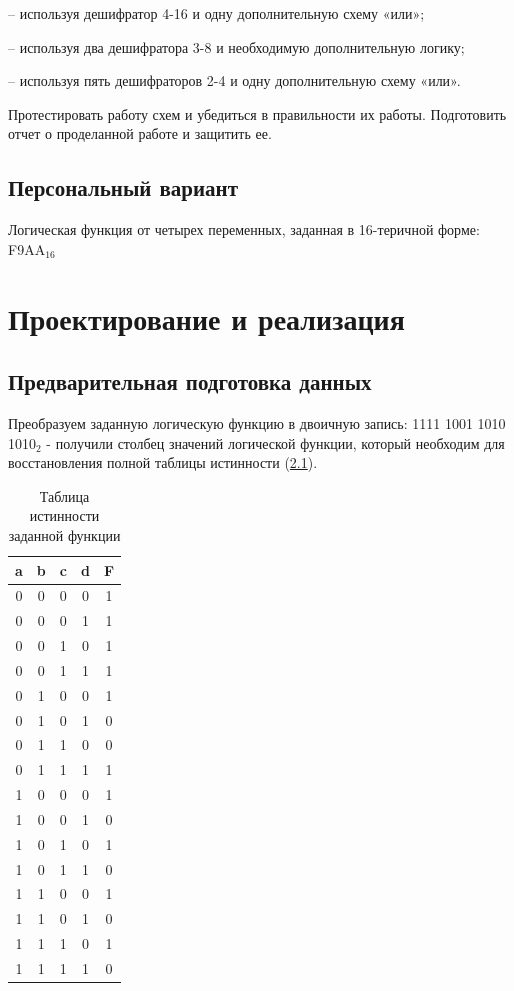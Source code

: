 \documentclass[14pt, a4paper]{extreport}
\begin{document}
– используя дешифратор 4-16 и одну дополнительную схему «или»;

– используя два дешифратора 3-8 и необходимую дополнительную логику;

– используя пять дешифраторов 2-4 и одну дополнительную схему «или».

Протестировать работу схем и убедиться в правильности их работы. Подготовить отчет о проделанной работе и защитить ее.

\section{Персональный вариант}
Логическая функция от четырех переменных, заданная в 16-теричной форме: F9AA$_{16}$

\chapter{Проектирование и реализация}
\section{Предварительная подготовка данных}
Преобразуем заданную логическую функцию в двоичную запись: 1111 1001 1010 1010$_2$ - получили столбец значений логической функции, который необходим для восстановления полной таблицы истинности (\cref{tab:function-values}).

\begin{table}[!htbp]
	\caption{Таблица истинности заданной функции}
	\label{tab:function-values}
	\begin{tabular}{|c|c|c|c|c|}
		\hline
		a & b & c & d & F \\
		\hline
		0 & 0 & 0 & 0 & 1 \\
		\hline
		0 & 0 & 0 & 1 & 1 \\
		\hline
		0 & 0 & 1 & 0 & 1 \\
		\hline
		0 & 0 & 1 & 1 & 1 \\
		\hline
		0 & 1 & 0 & 0 & 1 \\
		\hline
		0 & 1 & 0 & 1 & 0 \\
		\hline
		0 & 1 & 1 & 0 & 0 \\
		\hline
		0 & 1 & 1 & 1 & 1 \\
		\hline
		1 & 0 & 0 & 0 & 1 \\
		\hline
		1 & 0 & 0 & 1 & 0 \\
		\hline
		1 & 0 & 1 & 0 & 1 \\
		\hline
		1 & 0 & 1 & 1 & 0 \\
		\hline
		1 & 1 & 0 & 0 & 1 \\
		\hline
		1 & 1 & 0 & 1 & 0 \\
		\hline
		1 & 1 & 1 & 0 & 1 \\
		\hline
		1 & 1 & 1 & 1 & 0 \\
		\hline
	\end{tabular}
\end{table}
\end{document}

